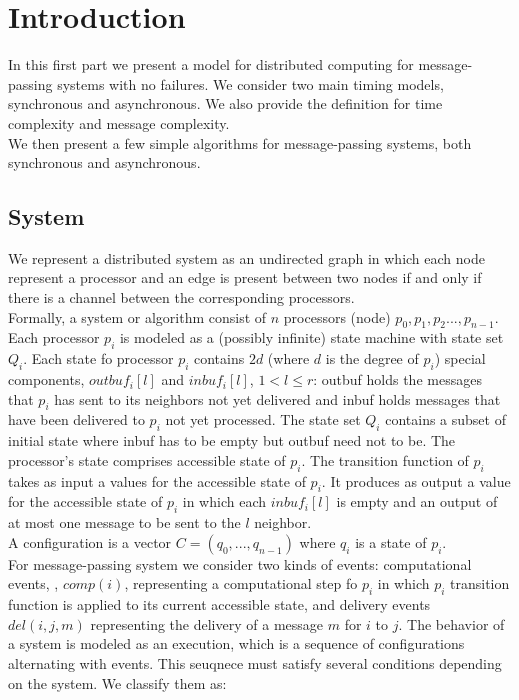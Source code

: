 \documentclass{article}
\begin{document}
\section{Introduction}
In this first part we present a model for distributed computing for message-passing systems with no failures. We consider two main timing models, synchronous and asynchronous. We also provide the definition for time complexity and message complexity.\\
We then present a few simple algorithms for message-passing systems, both synchronous and asynchronous.

\subsection{System}
We represent a distributed system as an undirected graph in which each node represent a processor and an edge is present between two nodes if and only if there is a channel between the corresponding processors.\\
Formally, a system or algorithm consist of $n$ processors (node) $p_0, p_1, p_2 ..., p_{n-1}$. Each processor $p_i$ is modeled as a (possibly infinite) state machine with state set $Q_i$. Each state fo processor $p_i$ contains $2d$ (where $d$ is the degree of $p_i$) special components, \textit{$outbuf_i[l]$} and \textit{$inbuf_i[l]$}, $1 < l \leq r$: outbuf holds the messages that $p_i$ has sent to its neighbors not yet delivered and inbuf holds messages that have been delivered to $p_i$ not yet processed. The state set $Q_i$ contains a subset of initial state where  inbuf has to be empty but outbuf need not to be.
The processor's state comprises accessible state of $p_i$. The transition function of $p_i$ takes as input a values for the accessible state of $p_i$. It produces as output a value for the accessible state of $p_i$ in which each $inbuf_i[l]$ is empty and an output of at most one message to be sent to the $l$ neighbor.\\
A configuration is a vector $C=(q_0, ..., q_{n-1})$ where $q_i$ is a state of $p_i$.\\
For message-passing system we consider two kinds of events: computational events, , $comp(i)$, representing a computational step fo $p_i$ in which $p_i$ transition function is applied to its current accessible state, and delivery events $del(i,j,m)$ representing the delivery of a message $m$ for $i$ to $j$.
The behavior of a system is modeled as an execution, which is a sequence of configurations alternating with events. This seuqnece must satisfy several conditions depending on the system. We classify them as:
\end{document}
